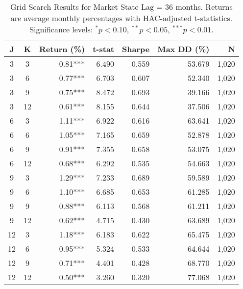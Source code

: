 \begin{table}[htbp]
\caption{Grid Search Results for Market State Lag = 36 months. Returns are average monthly percentages with HAC-adjusted t-statistics. Significance levels: $^{*}p<0.10$, $^{**}p<0.05$, $^{***}p<0.01$.}
\label{tab:grid_search_lag36}
\begin{tabular}{cc|rrrrr}
\toprule
J & K & Return (\%) & t-stat & Sharpe & Max DD (\%) & N \\
\midrule
3 & 3 & 0.81*** & 6.490 & 0.559 & 53.679 & 1,020 \\
3 & 6 & 0.77*** & 6.703 & 0.607 & 52.340 & 1,020 \\
3 & 9 & 0.75*** & 8.472 & 0.693 & 39.166 & 1,020 \\
3 & 12 & 0.61*** & 8.155 & 0.644 & 37.506 & 1,020 \\
6 & 3 & 1.11*** & 6.922 & 0.616 & 63.641 & 1,020 \\
6 & 6 & 1.05*** & 7.165 & 0.659 & 52.878 & 1,020 \\
6 & 9 & 0.91*** & 7.355 & 0.658 & 53.075 & 1,020 \\
6 & 12 & 0.68*** & 6.292 & 0.535 & 54.663 & 1,020 \\
9 & 3 & 1.29*** & 7.233 & 0.689 & 59.589 & 1,020 \\
9 & 6 & 1.10*** & 6.685 & 0.653 & 61.285 & 1,020 \\
9 & 9 & 0.88*** & 6.113 & 0.568 & 61.211 & 1,020 \\
9 & 12 & 0.62*** & 4.715 & 0.430 & 63.689 & 1,020 \\
12 & 3 & 1.18*** & 6.183 & 0.622 & 65.475 & 1,020 \\
12 & 6 & 0.95*** & 5.324 & 0.533 & 64.644 & 1,020 \\
12 & 9 & 0.71*** & 4.401 & 0.428 & 68.770 & 1,020 \\
12 & 12 & 0.50*** & 3.260 & 0.320 & 77.068 & 1,020 \\
\bottomrule
\end{tabular}
\end{table}
